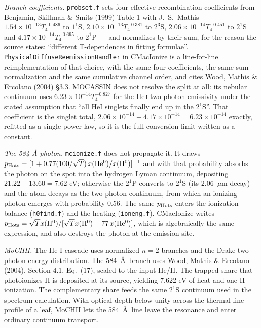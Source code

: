 \documentclass[11pt]{my_memo}
\begin{document}
\emph{Branch coefficients.}  \texttt{probset.f} sets four effective recombination coefficients from Benjamin, Skillman \& Smits (1999) Table 1 with J.\ S.\ Mathis --- $1.54\times10^{-13}T_4^{-0.486}$ to $1^1$S, $2.10\times10^{-13}T_4^{-0.381}$ to $2^3$S, $2.06\times10^{-14}T_4^{-0.451}$ to $2^1$S and $4.17\times10^{-14}T_4^{-0.695}$ to $2^1$P --- and normalizes by their sum, for the reason the source states: ``different T-dependences in fitting formulae''.  \texttt{PhysicalDiffuseReemissionHandler} in CMacIonize is a line-for-line reimplementation of that choice, with the same four coefficients, the same sum normalization and the same cumulative channel order, and cites Wood, Mathis \& Ercolano (2004) \S3.3.  MOCASSIN does not resolve the split at all: its nebular continuum uses $6.23\times10^{-14}T_4^{-0.827}$ for the He\,\textsc{i} two-photon emissivity under the stated assumption that ``all HeI singlets finally end up in the $2^1$S''.  That coefficient is the singlet total, $2.06\times10^{-14}+4.17\times10^{-14}=6.23\times10^{-14}$ exactly, refitted as a single power law, so it is the full-conversion limit written as a constant.

\emph{The 584 \AA{} photon.}  \texttt{mcionize.f} does not propagate it.  It draws $p_{\rm Hots}=[1+0.77(100/\sqrt{T})\,x({\rm He^0})/x({\rm H^0})]^{-1}$ and with that probability absorbs the photon on the spot into the hydrogen Lyman continuum, depositing $21.22-13.60=7.62$ eV; otherwise the $2^1$P converts to $2^1$S (its 2.06~$\mu$m decay) and the atom decays as the two-photon continuum, from which an ionizing photon emerges with probability 0.56.  The same $p_{\rm Hots}$ enters the ionization balance (\texttt{h0find.f}) and the heating (\texttt{ioneng.f}).  CMacIonize writes $p_{\rm Hots}=\sqrt{T}x({\rm H^0})/[\sqrt{T}x({\rm H^0})+77\,x({\rm He^0})]$, which is algebraically the same expression, and also destroys the photon at the emission site.

\emph{MoCHII.} The He I cascade uses normalized $n=2$ branches and
the Drake two-photon energy distribution. The 584~\AA\ branch uses Wood,
Mathis \& Ercolano (2004), Section 4.1, Eq.~(17), scaled to the input He/H.
The trapped share that photoionizes H is deposited at its source, yielding
7.622 eV of heat and one H ionization. The complementary share feeds the
same $2^1$S continuum used in the spectrum calculation. With optical depth
below unity across the thermal line profile of a leaf, MoCHII lets the
584~\AA\ line leave the resonance and enter ordinary continuum transport.
\end{document}
